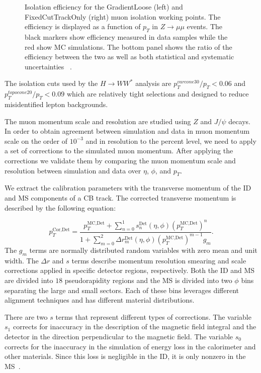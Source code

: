 \begin{figure}[!h]
\begin{minipage}[b]{0.48\textwidth}
  \end{minipage}
  \caption{Isolation efficiency for the GradientLoose (left) and FixedCutTrackOnly (right) muon isolation working points. The efficiency is displayed as a function of $p_T$ in $Z \rightarrow \mu\mu$ events. The black markers show efficiency measured in data samples while the red show MC simulations. The bottom panel shows the ratio of the efficiency between the two as well as both statistical and systematic uncertainties ~\cite{MCPPlots2}.}
  \label{fig:isolation}
\end{figure}

The isolation cuts used by the $H\rightarrow WW^*$ analysis are $p_T^{varcone30}/p_T<0.06$ and $p_T^{topocone20}/p_T<0.09$ which are relatively tight selections and designed to reduce misidentified lepton backgrounds. 

The muon momentum scale and resolution are studied using $Z$ and $J/\psi$ decays. In order to obtain agreement between simulation and data in muon momentum scale on the order of $10^{-3}$ and in resolution to the percent level, we need to apply a set of corrections to the simulated muon momentum. After applying the corrections we validate them by comparing the muon momentum scale and resolution between simulation and data over $\eta$, $\phi$, and $p_T$.

We extract the calibration parameters with the transverse momentum of the ID and MS components of a CB track.  The corrected transverse momentum is described by the following equation: 

\begin{equation}
    p_T^{\textrm{Cor,Det}} = \frac{p_T^{\textrm{MC,Det}}+\sum\limits_{n=0}^1s_n^{\textrm{Det}}(\eta,\phi)(p_T^{\textrm{MC,Det}})^n}{1+\sum\limits_{m=0}^2\Delta r_m^{\textrm{Det}}(\eta,\phi)(p_T^{\textrm{MC,Det}})^{m-1}g_m} .
\end{equation}
The $g_m$ terms are normally distributed random variables with zero mean and unit width. The $\Delta r $ and $s$ terms describe momentum resolution smearing and scale corrections applied in specific detector regions, respectively. Both the ID and MS are divided into $18$ pseudorapidity regions and the MS is divided into two $\phi$ bins separating the large and small sectors. Each of these bins leverages different alignment techniques and has different material distributions. 

There are two $s$ terms that represent different types of corrections. The variable $s_1$ corrects for inaccuracy in the description of the magnetic field integral and the detector in the direction perpendicular to the magnetic field. The variable $s_0$ corrects for the inaccuracy in the simulation of energy loss in the calorimeter and other materials. Since this loss is negligible in the ID, it is only nonzero in the MS~\cite{MCPpaper}.


